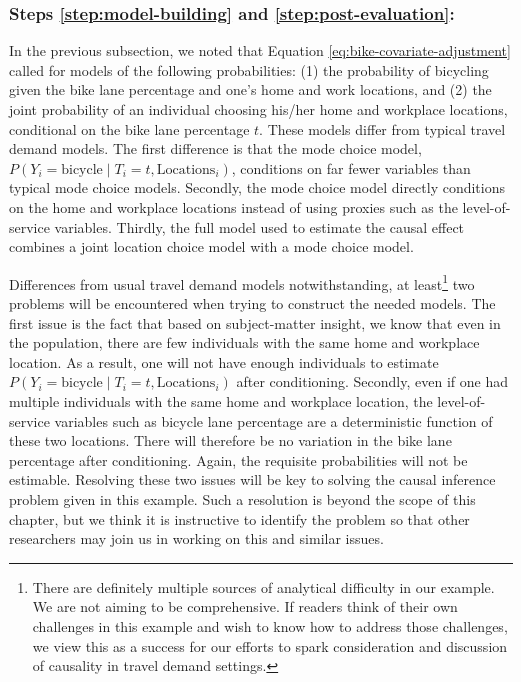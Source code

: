 \subsubsection*{Steps \ref{step:model-building} and \ref{step:post-evaluation}:}
In the previous subsection, we noted that Equation \ref{eq:bike-covariate-adjustment} called for models of the following probabilities: (1) the probability of bicycling given the bike lane percentage and one's home and work locations, and (2) the joint probability of an individual choosing his/her home and workplace locations, conditional on the bike lane percentage $t$. These models differ from typical travel demand models. The first difference is that the mode choice model, $P \left( Y_i = \textrm{bicycle} \mid T_i = t, \textrm{Locations$_i$} \right)$, conditions on far fewer variables than typical mode choice models. Secondly, the mode choice model directly conditions on the home and workplace locations instead of using proxies such as the level-of-service variables. Thirdly, the full model used to estimate the causal effect combines a joint location choice model with a mode choice model.

Differences from usual travel demand models notwithstanding, at least\footnote{There are definitely multiple sources of analytical difficulty in our example. We are not aiming to be comprehensive. If readers think of their own challenges in this example and wish to know how to address those challenges, we view this as a success for our efforts to spark consideration and discussion of causality in travel demand settings.} two problems will be encountered when trying to construct the needed models. The first issue is the fact that based on subject-matter insight, we know that even in the population, there are few individuals with the same home and workplace location. As a result, one will not have enough individuals to estimate $P \left( Y_i = \textrm{bicycle} \mid T_i = t, \textrm{Locations$_i$} \right)$ after conditioning. Secondly, even if one had multiple individuals with the same home and workplace location, the level-of-service variables such as bicycle lane percentage are a deterministic function of these two locations. There will therefore be no variation in the bike lane percentage after conditioning. Again, the requisite probabilities will not be estimable. Resolving these two issues will be key to solving the causal inference problem given in this example. Such a resolution is beyond the scope of this chapter, but we think it is instructive to identify the problem so that other researchers may join us in working on this and similar issues.

